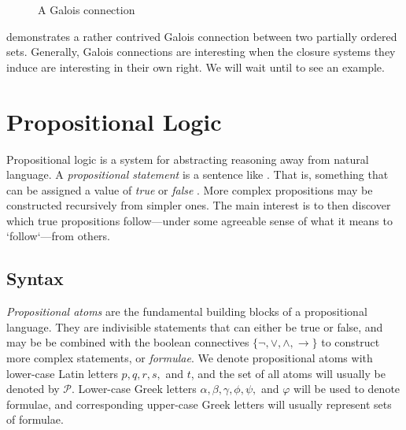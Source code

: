 \begin{figure}[H]
  \caption{A Galois connection}
  \label{figure:Galois-connection}
\end{figure}

 demonstrates a rather contrived Galois connection between two partially ordered sets. Generally, Galois connections are interesting when the closure systems they induce
are interesting in their own right. We will wait until  to see an example.

\section{Propositional Logic}
\label{section:propositional-logic}

Propositional logic is a system for abstracting reasoning away from natural language. A \textit{propositional statement} is a sentence like . That is, something that
can be assigned a value of \textit{true} or \textit{false} \cite[p. 7]{Ben1993Mathematical}. More complex propositions may be constructed recursively from simpler ones. The main interest is to then
discover which true propositions follow---under some agreeable sense of what it means to `follow`---from others.

\subsection{Syntax}
\label{subsection:syntax}      
  \textit{Propositional atoms} are the fundamental building blocks of a propositional language. They are indivisible
statements that can either be true or false, and may be be combined with the boolean connectives $\{\neg, \lor, \land, \rightarrow\}$ to construct more complex statements, or \textit{formulae}. We
denote propositional atoms with lower-case Latin letters $p,q,r,s,$ and $t$, and the set of all atoms will usually be denoted by $\mathcal{P}$. Lower-case Greek letters
$\alpha, \beta, \gamma, \phi, \psi,$ and $\varphi$ will be used to denote formulae, and corresponding upper-case Greek letters will usually represent sets of formulae.

